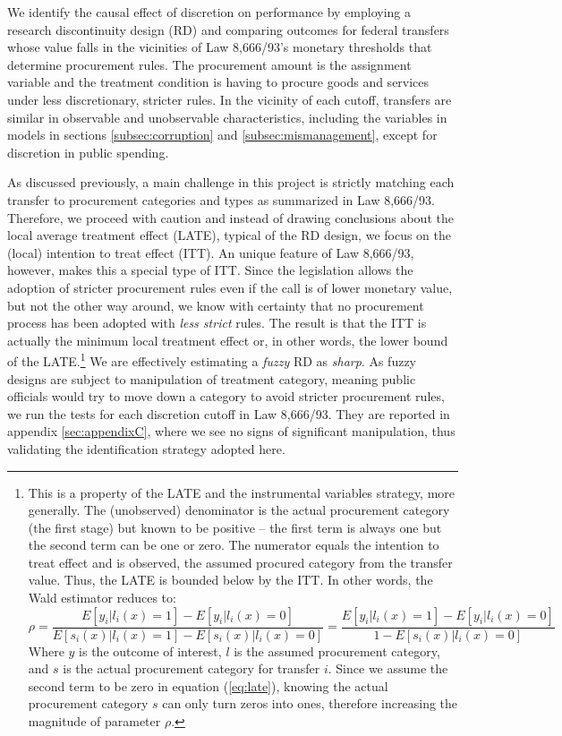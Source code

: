 \documentclass[11pt]{article}
\begin{document}
We identify the causal effect of discretion on performance by employing a research discontinuity design (RD) and comparing outcomes for federal transfers whose value falls in the vicinities of Law 8,666/93's monetary thresholds that determine procurement rules. The procurement amount is the assignment variable and the treatment condition is having to procure goods and services under less discretionary, stricter rules. In the vicinity of each cutoff, transfers are similar in observable and unobservable characteristics, including the variables in models in sections \ref{subsec:corruption} and \ref{subsec:mismanagement}, except for discretion in public spending.

As discussed previously, a main challenge in this project is strictly matching each transfer to procurement categories and types as summarized in Law 8,666/93. Therefore, we proceed with caution and instead of drawing conclusions about the local average treatment effect (LATE), typical of the RD design, we focus on the (local) intention to treat effect (ITT). An unique feature of Law 8,666/93, however, makes this a special type of ITT. Since the legislation allows the adoption of stricter procurement rules even if the call is of lower monetary value, but not the other way around, we know with certainty that no procurement process has been adopted with \emph{less strict} rules. The result is that the ITT is actually the minimum local treatment effect or, in other words, the lower bound of the LATE.\footnote{This is a property of the LATE and the instrumental variables strategy, more generally. The (unobserved) denominator is the actual procurement category (the first stage) but known to be positive -- the first term is always one but the second term can be one or zero. The numerator equals the intention to treat effect and is observed, the assumed procured category from the transfer value. Thus, the LATE is bounded below by the ITT. In other words, the Wald estimator reduces to:
\begin{equation} \label{eq:late}
  \rho = \frac{E[y_{i}|l_{i}(x)=1]-E[y_{i}|l_{i}(x)=0]}{E[s_{i}(x)|l_{i}(x)=1]-E[s_{i}(x)|l_{i}(x)=0]} = \frac{E[y_{i}|l_{i}(x)=1]-E[y_{i}|l_{i}(x)=0]}{1-E[s_{i}(x)|l_{i}(x)=0]}
\end{equation}
Where $y$ is the outcome of interest, $l$ is the assumed procurement category, and $s$ is the actual procurement category for transfer $i$. Since we assume the second term to be zero in equation (\ref{eq:late}), knowing the actual procurement category $s$ can only turn zeros into ones, therefore increasing the magnitude of parameter $\rho$.} We are effectively estimating a \emph{fuzzy} RD as \emph{sharp}. As fuzzy designs are subject to manipulation of treatment category, meaning public officials would try to move down a category to avoid stricter procurement rules, we run the \citet{McCraryManipulationrunningvariable2008} tests for each discretion cutoff in Law 8,666/93. They are reported in appendix \ref{sec:appendixC}, where we see no signs of significant manipulation, thus validating the identification strategy adopted here.
\end{document}
